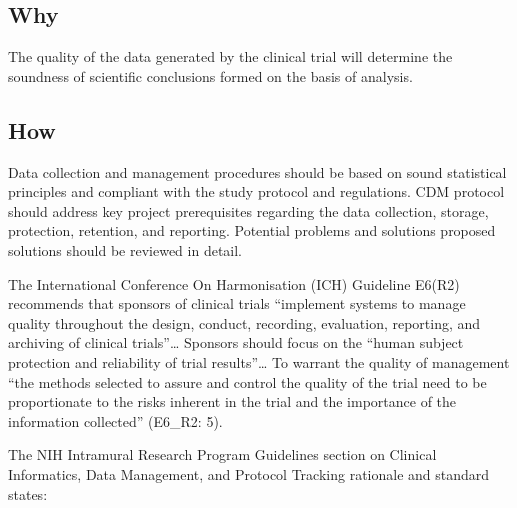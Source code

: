 \documentclass[]{book}
\begin{document}
\subsection{Why}\label{why-17}

The quality of the data generated by the clinical trial will determine
the soundness of scientific conclusions formed on the basis of analysis.

\subsection{How}\label{how-17}

Data collection and management procedures should be based on sound
statistical principles and compliant with the study protocol and
regulations. CDM protocol should address key project prerequisites
regarding the data collection, storage, protection, retention, and
reporting. Potential problems and solutions proposed solutions should be
reviewed in detail.

The International Conference On Harmonisation (ICH) Guideline E6(R2)
recommends that sponsors of clinical trials ``implement systems to
manage quality throughout the design, conduct, recording, evaluation,
reporting, and archiving of clinical trials''\ldots{} Sponsors should
focus on the ``human subject protection and reliability of trial
results''\ldots{} To warrant the quality of management ``the methods
selected to assure and control the quality of the trial need to be
proportionate to the risks inherent in the trial and the importance of
the information collected'' (E6\_R2: 5).

The NIH Intramural Research Program Guidelines section on Clinical
Informatics, Data Management, and Protocol Tracking rationale and
standard states:
\end{document}
